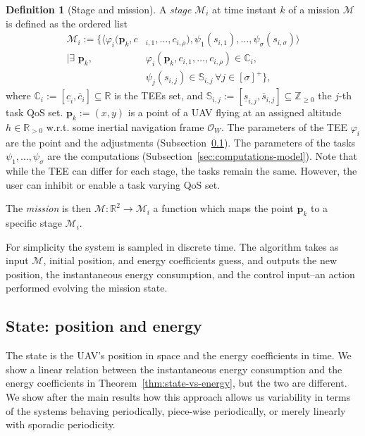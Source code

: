 \documentclass[letterpaper,10pt,conference]{ieeeconf}
\theoremstyle{definition}
\newtheorem{defn}{Definition}[section]
\begin{document}
\begin{defn}[Stage and mission]\label{def:mission}
  A \emph{stage} $\mathcal{M}_i$ at time instant $k$ of a mission $\mathcal{M}$ is defined as the ordered list
  \begin{equation}\label{eq:mission}\begin{split}
    \mathcal{M}_i:=\{\langle\varphi_i(\mathbf{p}_k,c&_{i,1},\dots,c_{i,\rho}),\psi_1(s_{i,1}),\dots,\psi_\sigma(s_{i,\sigma})\rangle\\\mid
      \exists\,\,\mathbf{p}_k,\,&\varphi_i(\mathbf{p}_k,c_{i,1},\dots,c_{i,\rho})\in\mathbb{C}_i,\,\\
      &\psi_j(s_{i,j})\in\mathbb{S}_{i,j}\,\forall j\in[\sigma]^+\},
  \end{split}\end{equation}
  where $\mathbb{C}_i:=[\underline{c}_i,\overline{c}_i]\subseteq\mathbb{R}$ is the TEEs set, and $\mathbb{S}_{i,j}:=[\underline{s}_{i,j},\overline{s}_{i,j}]\subseteq\mathbb{Z}_{\geq 0}$ the $j$-th task QoS set. $\mathbf{p}_k:=(x,y)$ is a point of a UAV flying at an assigned altitude $h\in\mathbb{R}_{>0}$ w.r.t. some inertial navigation frame $\mathcal{O}_W$. The parameters of the TEE $\varphi_i$ are the point and the adjustments (Subsection~\ref{sec:model}). The parameters of the tasks $\psi_1,\dots,\psi_\sigma$ are the computations (Subsection~\ref{sec:computations-model}). Note that while the TEE can differ for each stage, the tasks remain the same. However, the user can inhibit or enable a task varying QoS set.

  The \emph{mission} is then $\mathcal{M}:\mathbb{R}^2\rightarrow\mathcal{M}_i$ a function which maps the point $\mathbf{p}_k$ to a specific stage $\mathcal{M}_i$.
  
  For simplicity the system is sampled in discrete time. The algorithm takes as input $\mathcal{M}$, initial position, and energy coefficients guess, and outputs the new position, the instantaneous energy consumption, and the control input--an action performed evolving the mission state.
\end{defn}

\subsection{State: position and energy}
\label{sec:model}

The state is the UAV's position in space and the energy coefficients in time. We show a linear relation between the instantaneous energy consumption and the energy coefficients in Theorem~\ref{thm:state-vs-energy}, but the two are different. We show after the main results how this approach allows us variability in terms of the systems behaving periodically, piece-wise periodically, or merely linearly with sporadic periodicity.
\end{document}

